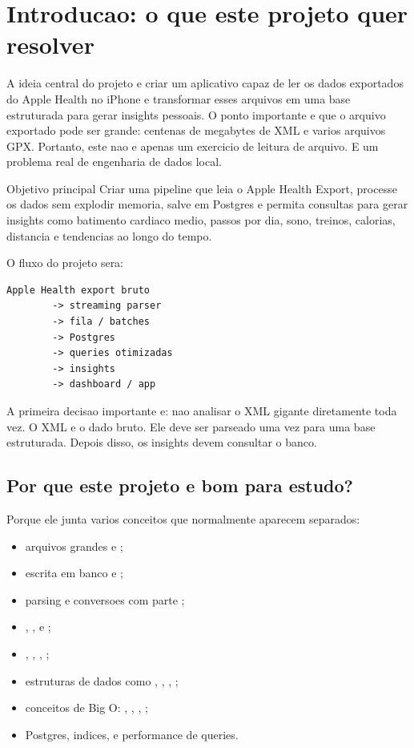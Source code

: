 \chapter{Introducao: o que este projeto quer resolver}

A ideia central do projeto e criar um aplicativo capaz de ler os dados exportados do Apple Health no iPhone e transformar esses arquivos em uma base estruturada para gerar insights pessoais. O ponto importante e que o arquivo exportado pode ser grande: centenas de megabytes de XML e varios arquivos GPX. Portanto, este nao e apenas um exercicio de leitura de arquivo. E um problema real de engenharia de dados local.

\begin{studybox}{Objetivo principal}
Criar uma pipeline que leia o Apple Health Export, processe os dados sem explodir memoria, salve em Postgres e permita consultas para gerar insights como batimento cardiaco medio, passos por dia, sono, treinos, calorias, distancia e tendencias ao longo do tempo.
\end{studybox}

O fluxo do projeto sera:

\begin{verbatim}
Apple Health export bruto
        -> streaming parser
        -> fila / batches
        -> Postgres
        -> queries otimizadas
        -> insights
        -> dashboard / app
\end{verbatim}

A primeira decisao importante e: nao analisar o XML gigante diretamente toda vez. O XML e o dado bruto. Ele deve ser parseado uma vez para uma base estruturada. Depois disso, os insights devem consultar o banco.

\section{Por que este projeto e bom para estudo?}

Porque ele junta varios conceitos que normalmente aparecem separados:

\begin{itemize}[leftmargin=1.2cm]
  \item arquivos grandes e ;
  \item escrita em banco e ;
  \item parsing e conversoes com parte ;
  \item {}, ,  e ;
  \item {}, , , ;
  \item estruturas de dados como , , , ;
  \item conceitos de Big O: , , , ;
  \item Postgres, indices,  e performance de queries.
\end{itemize}

